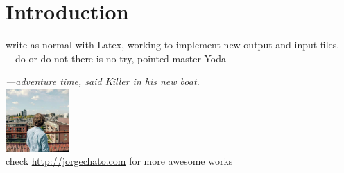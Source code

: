 \chapter{Introduction}
write as normal with Latex, working to implement new output and input files.\\
---do or do not there is no try, pointed master Yoda\par
\textit{---adventure time, said Killer in his new boat.}\\
\includegraphics[width=0.18\textwidth]{./images/0.jpg}\\
check \url{http://jorgechato.com} for more awesome works
